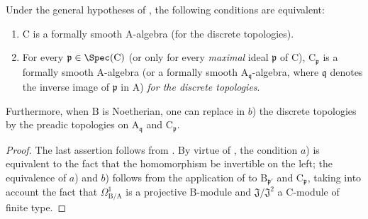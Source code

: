 \begin{corollary}[22.6.6]
\label{0.22.6.6}
Under the general hypotheses of , the following conditions are equivalent:
\begin{enumerate}
  \item[a)] $\mathrm{C}$ is a formally smooth $\mathrm{A}$-algebra (for the discrete topologies).
  \item[b)] For every $\mathfrak{p}\in\Spec(\mathrm{C})$ (or only for every \emph{maximal} ideal $\mathfrak{p}$ of $\mathrm{C}$), $\mathrm{C}_\mathfrak{p}$ is a formally smooth $\mathrm{A}$-algebra (or a formally smooth $\mathrm{A}_{\mathfrak{q}}$-algebra, where $\mathfrak{q}$ denotes the inverse image of $\mathfrak{p}$ in $\mathrm{A}$) \emph{for the discrete topologies}.
\end{enumerate}
Furthermore, when $\mathrm{B}$ is Noetherian, one can replace in $b$) the discrete topologies by the preadic topologies on $\mathrm{A}_{\mathfrak{q}}$ and $\mathrm{C}_\mathfrak{p}$.
\end{corollary}

\begin{proof}
The last assertion follows from .
By virtue of , the condition $a$) is equivalent to the fact that the homomorphism  be invertible on the left; the equivalence of $a$) and $b$) follows from the application of  to $\mathrm{B}_{\mathfrak{p}'}$ and $\mathrm{C}_\mathfrak{p}$, taking into account the fact that $\Omega^1_{\mathrm{B}/\mathrm{A}}$ is a projective $\mathrm{B}$-module and $\mathfrak{J}/\mathfrak{J}^2$ a $\mathrm{C}$-module of finite type.
\end{proof}

